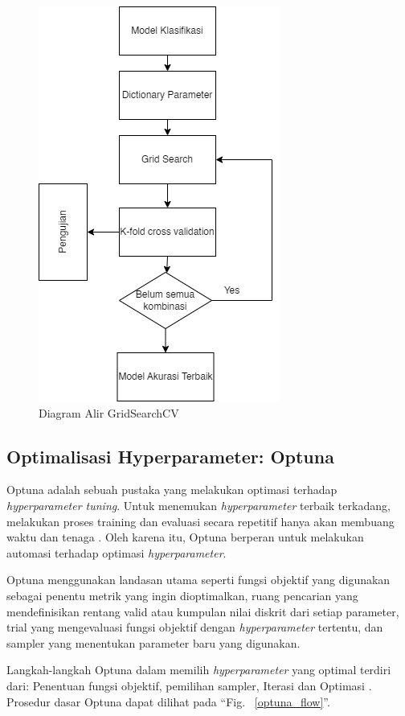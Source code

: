 \documentclass[conference]{IEEEtran}
\begin{document}
\begin{figure}[htbp]
    \centerline{\includegraphics[scale=0.5]{gridsearch.png}}
    \caption{Diagram Alir GridSearchCV}
    \label{gridsearch_flow}
\end{figure}

\subsection{Optimalisasi Hyperparameter: Optuna}

Optuna adalah sebuah pustaka yang melakukan optimasi terhadap \textit{hyperparameter tuning}. 
Untuk menemukan \textit{hyperparameter} terbaik terkadang, melakukan proses training dan evaluasi secara repetitif hanya akan
membuang waktu dan tenaga \cite{b44}. Oleh karena itu, Optuna berperan untuk melakukan automasi terhadap optimasi \textit{hyperparameter}.

Optuna menggunakan landasan utama seperti fungsi objektif yang digunakan sebagai penentu metrik yang ingin dioptimalkan, 
ruang pencarian yang mendefinisikan rentang valid atau kumpulan nilai diskrit dari setiap parameter, trial yang mengevaluasi 
fungsi objektif dengan \textit{hyperparameter} tertentu, dan sampler yang menentukan parameter baru yang digunakan.

Langkah-langkah Optuna dalam memilih \textit{hyperparameter} yang optimal terdiri dari: Penentuan fungsi objektif, 
pemilihan sampler, Iterasi dan Optimasi \cite{b45}. Prosedur dasar Optuna dapat dilihat pada ``Fig. ~\ref{optuna_flow}''.
\end{document}
